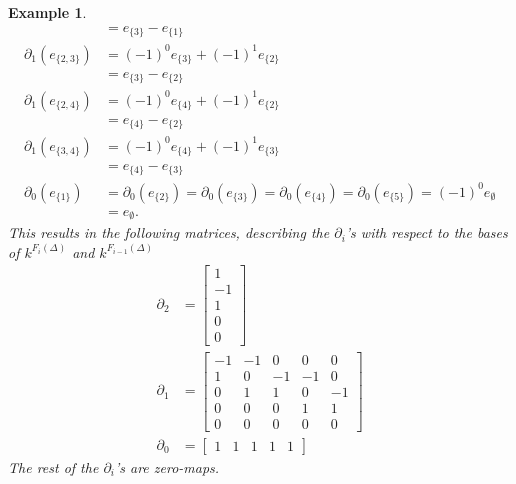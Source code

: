 \documentclass[11pt,a4paper,twoside]{report}
\newtheorem{myex}[mythm]{Example}
\begin{document}
\begin{myex}
\begin{align*}
&=e_{\{3\}}-e_{\{1\}}\\
\partial_1(e_{\{2,3\}})&=(-1)^0e_{\{3\}}+(-1)^1e_{\{2\}}\\
&=e_{\{3\}}-e_{\{2\}}\\
\partial_1(e_{\{2,4\}})&=(-1)^0e_{\{4\}}+(-1)^1e_{\{2\}}\\
&=e_{\{4\}}-e_{\{2\}}\\
\partial_1(e_{\{3,4\}})&=(-1)^0e_{\{4\}}+(-1)^1e_{\{3\}}\\
&=e_{\{4\}}-e_{\{3\}}\\
\partial_0(e_{\{1\}})&=\partial_0(e_{\{2\}})=\partial_0(e_{\{3\}})=\partial_0(e_{\{4\}})=\partial_0(e_{\{5\}})=(-1)^0e_{\emptyset}\\
&=e_{\emptyset}.
\end{align*}
This results in the following matrices, describing the $\partial_i$'s with respect to the bases of $k^{F_i(\Delta)}$ and $k^{F_{i-1}(\Delta)}$
\begin{align*}
\partial_2&=
\begin{bmatrix}
1\\
-1\\
1\\
0\\
0
\end{bmatrix}\\
\partial_1&=
\begin{bmatrix}
-1 & -1 & 0 & 0 & 0\\
1 & 0 & -1 & -1 & 0\\
0 & 1 & 1 & 0 & -1\\
0 & 0 & 0 & 1 & 1\\
0 & 0 & 0 & 0 & 0
\end{bmatrix}\\
\partial_0&=
\begin{bmatrix}
1 & 1 & 1 & 1 & 1 
\end{bmatrix}
\end{align*}
The rest of the $\partial_i$'s are zero-maps.


\end{myex}
\end{document}
